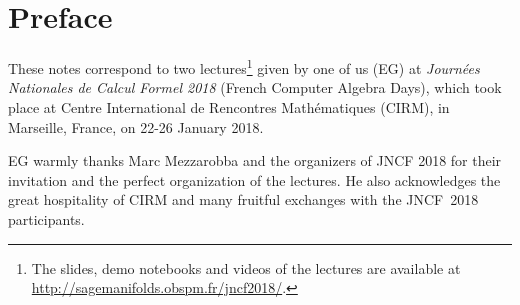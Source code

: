 \chapter*{Preface}
These notes correspond to two lectures\footnote{The slides, demo
notebooks and videos of the lectures are available at\\ \url{http://sagemanifolds.obspm.fr/jncf2018/}.} given by one of us (EG)
at \emph{Journées Nationales de Calcul Formel 2018}  (French Computer Algebra Days),
which took place at Centre International de Rencontres Mathématiques (CIRM),
in Marseille, France, on 22-26 January 2018.

EG warmly thanks Marc Mezzarobba and the organizers of JNCF 2018 for their
invitation and the perfect organization of the lectures. He also acknowledges
the great hospitality of CIRM and many fruitful exchanges with the JNCF~2018
participants.
